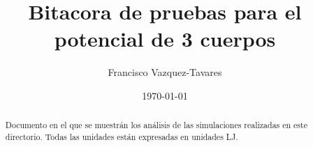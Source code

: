 \documentclass[a4paper,strict]{tufte-handout} %
\title{ Bitacora de pruebas para el potencial de 3 cuerpos }
\author{Francisco Vazquez-Tavares}
\date{\today} %
\begin{document}
\maketitle %


\begin{abstract}
Documento en el que se muestrán los análisis de las simulaciones realizadas en este directorio.
Todas las unidades están expresadas en unidades LJ.
\end{abstract}



%
%


%
%

\end{document}
